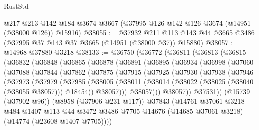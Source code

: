 \begin{lexlean}{RustStd}
\begin{coremodule}
    @217
    @213
    @142
    @184
    @3674
    @3667
    (@37995 @126 @142 @126 @3674 (@14951 (@38000 @126)) @15916)
@38055 := @37932
    @211
    @113
    @143
    @44
    @3665
    @3486
    (@37995 @37 @143 @37 @3665 (@14951 (@38000 @37)) @15880)
@38057 := @14968 @37880 @3218
@38133 := @36750
    (@36772
      (@36811
        (@36813
          (@36815
            (@36832
              (@36848
                (@36865
                  (@36878
                    (@36891
                      (@36895
                        (@36934
                          (@36998
                            (@37060
                              (@37088
                                (@37844
                                  (@37862
                                    (@37875
                                      (@37915
                                        (@37925
                                          (@37930
                                            (@37938
                                              (@37946
                                                (@37973
                                                  (@37979
                                                    (@37985
                                                      (@38005
                                                        (@38011
                                                          (@38014
                                                            (@38022
                                                              (@38025 (@38040 (@38055 @38057)))
                                                              @18454))
                                                          @38057)))
                                                    @38057)))
                                              @38057))
                                          @37531))
                                      (@15739 (@37902 @96))
                                      (@8958 (@37906 @231 @117))
                                      @37843
                                      (@14761
                                        @37061
                                        @3218
                                        @484
                                        @1407
                                        @113
                                        @44
                                        @3472
                                        @3486
                                        @7705
                                        @14676
                                        (@14685 @37061 @3218)
                                        (@14774 (@23608 @1407 @7705))))

\end{coremodule}
\end{lexlean}
